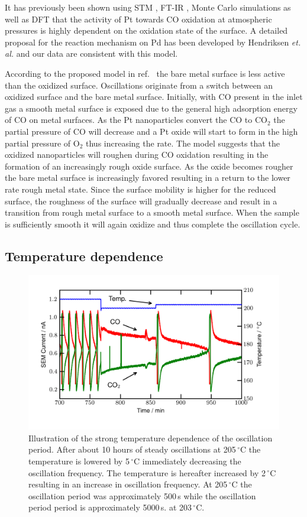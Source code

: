 \documentclass[journal=jacsat,manuscript=article]{achemso}
\begin{document}
It has previously been shown using STM \cite{Hendriksen2002}, FT-IR
\cite{Carlsson2006}, Monte Carlo simulations \cite{Zhdanov2002} as well as DFT
\cite{Gong2004} that the activity of Pt towards CO oxidation at atmospheric
pressures is highly dependent on the oxidation state of the surface. A detailed
proposal for the reaction mechanism on Pd has been developed by Hendriksen
\textit{et. al.}\cite{Hendriksen2010} and our data are consistent with this
model.

According to the proposed model in ref.~ the bare metal
surface is less active than the oxidized surface. Oscillations originate from a
switch between an oxidized surface and the bare metal surface. Initially, with
CO present in the inlet gas a smooth metal surface is exposed due to the
general high adsorption energy of CO on metal surfaces. As the Pt nanoparticles
convert the CO to CO$_2$ the partial pressure of CO will decrease and a Pt
oxide will start to form in the high partial pressure of O$_2$ thus increasing
the rate. The model suggests that the oxidized
nanoparticles will roughen during CO oxidation resulting in the formation of an
increasingly rough oxide surface. As the oxide becomes rougher the bare metal
surface is increasingly favored resulting in a return to the lower rate rough
metal state. Since the surface mobility is higher for the reduced surface\cite{Hendriksen2010},
the roughness of the surface will gradually decrease and result
in a transition from rough metal surface to a smooth metal surface.
When the sample is sufficiently smooth it will again oxidize and thus complete
the oscillation cycle.

\subsection{Temperature dependence}
\begin{figure}
\includegraphics[width=12cm]{temperature_dependence.png}
\caption{Illustration of the strong temperature dependence of the oscillation period. After about 10
  hours of steady oscillations at 205\,$^\circ$C the temperature is lowered by
  5\,$^\circ$C immediately decreasing the oscillation frequency. The temperature
  is hereafter increased by 2\,$^\circ$C resulting in an increase in oscillation
  frequency. At 205\,$^\circ$C the oscillation period was approximately 500\,s
  while the oscillation period period is approximately 5000\,s. at
  203\,$^\circ$C.
  \label{fgr:temperature_dependence}
}
\end{figure}
\end{document}
